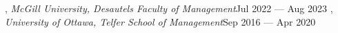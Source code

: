 , \textit{McGill University, Desautels Faculty of Management}\hfill Jul 2022 --- Aug 2023
\vspace{0.1em}
, \textit{University of Ottawa, Telfer School of Management}\hfill Sep 2016 --- Apr 2020


